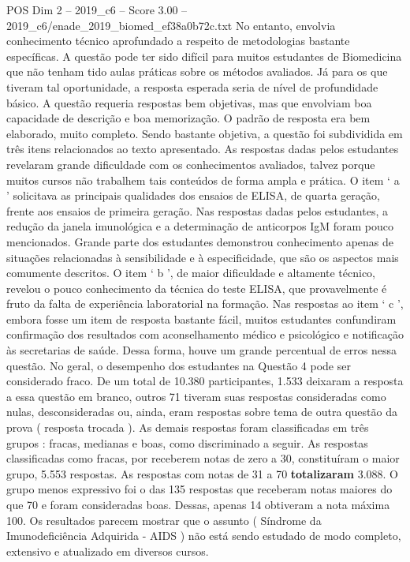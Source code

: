 \begin{textsample}{POS Dim 2 – 2019\_c6 – Score 3.00 – 2019\_c6/enade\_2019\_biomed\_ef38a0b72c.txt}
No entanto, envolvia conhecimento técnico aprofundado a respeito de metodologias bastante específicas.
A questão pode ter sido difícil para muitos estudantes de Biomedicina que não tenham tido aulas práticas sobre os métodos avaliados.
Já para os que tiveram tal oportunidade, a resposta esperada seria de nível de profundidade básico.
A questão requeria respostas bem objetivas, mas que envolviam boa capacidade de descrição e boa memorização.
O padrão de resposta era bem elaborado, muito completo.
Sendo bastante objetiva, a questão foi subdividida em três itens relacionados ao texto apresentado.
As respostas dadas pelos estudantes revelaram grande dificuldade com os conhecimentos avaliados, talvez porque muitos cursos não trabalhem tais conteúdos de forma ampla e prática.
O item ‘ a ’ solicitava as principais qualidades dos ensaios de ELISA, de quarta geração, frente aos ensaios de primeira geração.
Nas respostas dadas pelos estudantes, a redução da janela imunológica e a determinação de anticorpos IgM foram pouco mencionados.
Grande parte dos estudantes demonstrou conhecimento apenas de situações relacionadas à sensibilidade e à especificidade, que são os aspectos mais comumente descritos.
O item ‘ b ’, de maior dificuldade e altamente técnico, revelou o pouco conhecimento da técnica do teste ELISA, que provavelmente é fruto da falta de experiência laboratorial na formação.
Nas respostas ao item ‘ c ’, embora fosse um item de resposta bastante fácil, muitos estudantes confundiram confirmação dos resultados com aconselhamento médico e psicológico e notificação às secretarias de saúde.
Dessa forma, houve um grande percentual de erros nessa questão.
No geral, o desempenho dos estudantes na Questão 4 pode ser considerado fraco.
De um total de 10.380 participantes, 1.533 deixaram a resposta a essa questão em branco, outros 71 tiveram suas respostas consideradas como nulas, desconsideradas ou, ainda, eram respostas sobre tema de outra questão da prova ( resposta trocada ).
As demais respostas foram classificadas em três grupos : fracas, medianas e boas, como discriminado a seguir.
As respostas classificadas como fracas, por receberem notas de zero a 30, constituíram o maior grupo, 5.553 respostas.
As respostas com notas de 31 a 70 \textbf{totalizaram} 3.088.
O grupo menos expressivo foi o das 135 respostas que receberam notas maiores do que 70 e foram consideradas boas.
Dessas, apenas 14 obtiveram a nota máxima 100.
Os resultados parecem mostrar que o assunto ( Síndrome da Imunodeficiência Adquirida - AIDS ) não está sendo estudado de modo completo, extensivo e atualizado em diversos cursos.

\end{textsample}
